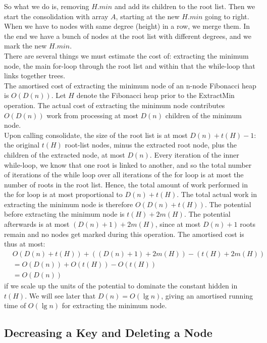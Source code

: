 So what we do is, removing $H.min$ and add its children to the root list. Then we start the consolidation with array $A$, starting at the new $H.min$ going to right. When we have to nodes with same degree (height) in a row, we merge them. In the end we have a bunch of nodes at the root list with different degrees, and we mark the new $H.min$. \\

There are several things we must estimate the cost of: extracting the minimum node, the main for-loop through the root list and within that the while-loop that links together trees.\\

The amortised cost of extracting the minimum node of an n-node Fibonacci heap is $O(D(n))$. Let $H$ denote the Fibonacci heap prior to the ExtractMin operation. The actual cost of extracting the minimum node contributes $O(D(n))$ work from processing at most $D(n)$ children of the minimum node.\\

Upon calling consolidate, the size of the root list is at most $D(n) + t(H) - 1$: the original $t(H)$ root-list nodes, minus the extracted root node, plus the children of the extracted node, at most $D(n)$. Every iteration of the inner while-loop, we know that one root is linked to another, and so the total number of iterations of the while loop over all iterations of the for loop is at most the number of roots in the root list. Hence, the total amount of work performed in the for loop is at most proportional to $D(n)+ t(H)$. The total actual work in extracting the minimum node is therefore $O(D(n) + t(H))$. The potential before extracting the minimum node is $t(H) + 2m(H)$. The potential afterwards is at most $(D(n) + 1) + 2m(H)$, since at most $D(n) + 1$ roots remain and no nodes get marked during this operation. The amortised cost is thus at most:
\begin{align*}
	&O(D(n) + t(H)) + ((D(n) + 1) + 2m(H)) - (t(H) + 2m(H))\\
	&= O(D(n)) + O(t(H)) - O(t(H))\\
	&= O(D(n))
\end{align*}
if we scale up the units of the potential to dominate the constant hidden in $t(H)$. We will see later that $D(n) = O(\lg n)$, giving an amortised running time of $O(\lg n)$ for extracting the minimum node.
%
\subsection{Decreasing a Key and Deleting a Node}
